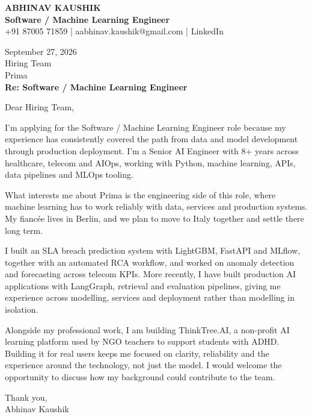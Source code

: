 \documentclass[10pt,a4paper]{article}
\begin{document}
\begin{center}
{\Large\bfseries ABHINAV KAUSHIK}\\[2pt]
{\bfseries Software / Machine Learning Engineer}\\[2pt]
+91 87005 71859 \quad | \quad aabhinav.kaushik@gmail.com \quad | \quad LinkedIn
\end{center}
\vspace{8pt}
September 27, 2026\\[6pt]
Hiring Team\\
Prima\\[4pt]
\textbf{Re: Software / Machine Learning Engineer}

Dear Hiring Team,

I’m applying for the Software / Machine Learning Engineer role because my experience has consistently covered the path from data and model development through production deployment. I’m a Senior AI Engineer with 8+ years across healthcare, telecom and AIOps, working with Python, machine learning, APIs, data pipelines and MLOps tooling.

What interests me about Prima is the engineering side of this role, where machine learning has to work reliably with data, services and production systems. My fiancée lives in Berlin, and we plan to move to Italy together and settle there long term.

I built an SLA breach prediction system with LightGBM, FastAPI and MLflow, together with an automated RCA workflow, and worked on anomaly detection and forecasting across telecom KPIs. More recently, I have built production AI applications with LangGraph, retrieval and evaluation pipelines, giving me experience across modelling, services and deployment rather than modelling in isolation.

Alongside my professional work, I am building ThinkTree.AI, a non-profit AI learning platform used by NGO teachers to support students with ADHD. Building it for real users keeps me focused on clarity, reliability and the experience around the technology, not just the model. I would welcome the opportunity to discuss how my background could contribute to the team.

Thank you,\\
Abhinav Kaushik
\end{document}

